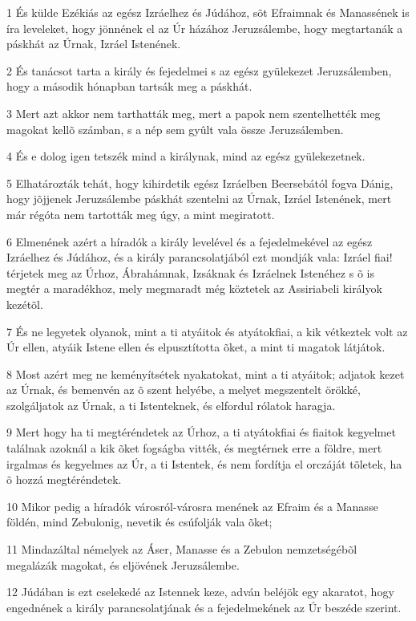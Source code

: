 \par 1 És külde Ezékiás az egész Izráelhez és Júdához, sõt Efraimnak és Manassének is íra leveleket, hogy jönnének el az Úr házához Jeruzsálembe, hogy megtartanák a páskhát az Úrnak, Izráel Istenének.
\par 2 És tanácsot tarta a király és fejedelmei s az egész gyülekezet Jeruzsálemben, hogy a második hónapban tartsák meg a páskhát.
\par 3 Mert azt akkor nem tarthatták meg, mert a papok nem szentelhették meg magokat kellõ számban, s a nép sem gyûlt vala össze Jeruzsálemben.
\par 4 És e dolog igen tetszék mind a királynak, mind az egész gyülekezetnek.
\par 5 Elhatározták tehát, hogy kihirdetik egész Izráelben Beersebától fogva Dánig, hogy jõjjenek Jeruzsálembe páskhát szentelni az Úrnak, Izráel Istenének, mert már régóta nem tartották meg úgy, a mint megiratott.
\par 6 Elmenének azért a híradók a király levelével és a fejedelmekével az egész Izráelhez és Júdához, és a király parancsolatjából ezt mondják vala: Izráel fiai! térjetek meg az Úrhoz, Ábrahámnak, Izsáknak és Izráelnek Istenéhez s õ is megtér a maradékhoz, mely megmaradt még köztetek az Assiriabeli királyok kezétõl.
\par 7 És ne legyetek olyanok, mint a ti atyáitok és atyátokfiai, a kik vétkeztek volt az Úr ellen, atyáik Istene ellen és elpusztította õket, a mint ti magatok látjátok.
\par 8 Most azért meg ne keményítsétek nyakatokat, mint a ti atyáitok; adjatok kezet az Úrnak, és bemenvén az õ szent helyébe, a melyet megszentelt örökké, szolgáljatok az Úrnak, a ti Istenteknek, és elfordul rólatok haragja.
\par 9 Mert hogy ha ti megtéréndetek az Úrhoz, a ti atyátokfiai és fiaitok kegyelmet találnak azoknál a kik õket fogságba vitték, és megtérnek  erre a földre, mert irgalmas és kegyelmes az Úr, a ti Istentek, és nem fordítja el orczáját tõletek, ha õ hozzá megtéréndetek.
\par 10 Mikor pedig a híradók városról-városra menének az Efraim és a Manasse földén, mind Zebulonig, nevetik és csúfolják vala õket;
\par 11 Mindazáltal némelyek az Áser, Manasse és a Zebulon nemzetségébõl megalázák magokat, és eljövének Jeruzsálembe.
\par 12 Júdában is ezt cselekedé az Istennek keze, adván beléjök egy akaratot, hogy engednének a király parancsolatjának és a fejedelmekének az Úr beszéde szerint.
